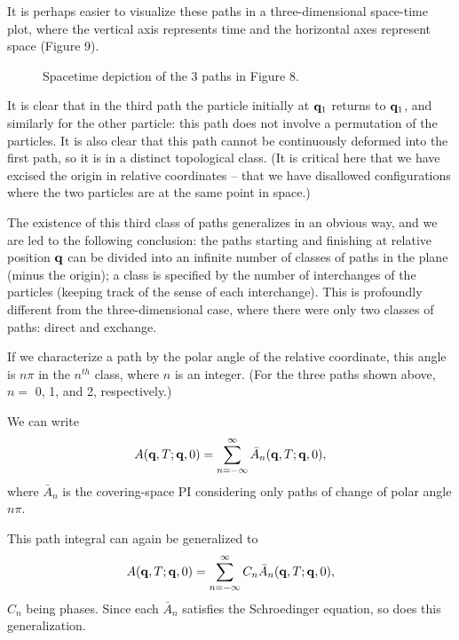 \documentclass[12pt]{article}
\begin{document}
It is perhaps easier to visualize these paths in a three-dimensional
space-time plot, where the vertical axis represents time and the
horizontal axes represent space (Figure 9).

\begin{figure}[hb]
\epsfysize=5cm
\centerline{}
\caption{Spacetime depiction of the 3 paths in Figure 8.}
\end{figure}


It is clear that in the third path the particle initially at ${\mathbf q}_1$ 
returns to ${\mathbf q}_1$, and similarly for the other particle: this path
does not involve a permutation of the particles. It is also
clear that this path cannot be continuously deformed
into the first path, so it is in a distinct topological class. (It
is critical here that we have excised the origin in relative
coordinates -- \ie that we have disallowed configurations where the two
particles are at the same point in space.)

The existence of this third class of paths generalizes in an obvious
way, and we are led to the following conclusion: the paths starting and
finishing at relative
position ${\mathbf q}$ can be divided into an infinite
number of classes of paths in the
plane (minus the origin); a class is specified by the number
of interchanges of
the particles (keeping track of the sense of each interchange). This
is profoundly different from the three-dimensional case, where there
were only two classes of paths: direct and exchange.

If we characterize
a path by the polar angle of the relative coordinate,
this angle is $n\pi$ in the $n^{th}$ class, where $n$ is an
integer. (For the three paths shown above, $n=$ 0, 1, and 2,
respectively.)

We can write
\[
A({\mathbf q},T;{\mathbf q},0)=\sum_{n=-\infty}^{\infty}{\bar A}_n({\mathbf q},T;{\mathbf q},0),
\]
where ${\bar A}_n$ is the covering-space
PI considering only paths of change of polar
angle $n\pi$.

This path integral can again be generalized to
\[
A({\mathbf q},T;{\mathbf q},0)=
\sum_{n=-\infty}^{\infty}C_n{\bar A}_n({\mathbf q},T;{\mathbf q},0),
\]
$C_n$ being phases. Since each ${\bar A}_n$ satisfies the Schroedinger
equation, so does this generalization. 
\end{document}
